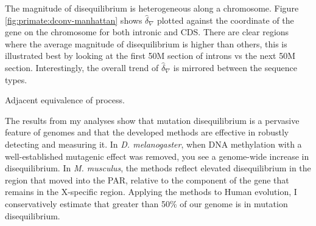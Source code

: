 

The magnitude of disequilibrium is heterogeneous along a chromosome. Figure \ref{fig:primate:dconv-manhattan} shows $\hat \delta_\nabla$ plotted against the coordinate of the gene on the chromosome for both intronic and CDS. There are clear regions where the average magnitude of disequilibrium is higher than others, this is illustrated best by looking at the first 50M section of introns vs the next 50M section. Interestingly, the overall trend of $\hat \delta_\nabla$ is mirrored between the sequence types. 



Adjacent equivalence of process. 

The results from my analyses show that mutation disequilibrium is a pervasive feature of genomes and that the developed methods are effective in robustly detecting and measuring it. In \textit{D. melanogaster}, when DNA methylation with a well-established mutagenic effect was removed, you see a genome-wide increase in disequilibrium. In \textit{M. musculus}, the methods reflect elevated disequilibrium in the region that moved into the PAR, relative to the component of the gene that remains in the X-specific region. Applying the methods to Human evolution, I conservatively estimate that greater than 50\% of our genome is in mutation disequilibrium.